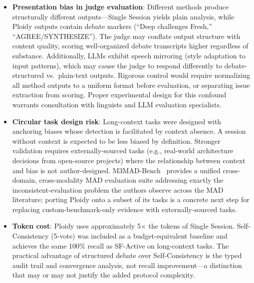 \documentclass[11pt]{article}
\begin{document}
\begin{itemize}[leftmargin=1.5em]
  \item \textbf{Presentation bias in judge evaluation}: Different methods produce structurally different outputs---Single Session yields plain analysis, while Ploidy outputs contain debate markers (``Deep challenges Fresh,'' ``AGREE/SYNTHESIZE''). The judge may conflate output structure with content quality, scoring well-organized debate transcripts higher regardless of substance. Additionally, LLMs exhibit speech mirroring (style adaptation to input patterns), which may cause the judge to respond differently to debate-structured vs.\ plain-text outputs. Rigorous control would require normalizing all method outputs to a uniform format before evaluation, or separating issue extraction from scoring. Proper experimental design for this confound warrants consultation with linguists and LLM evaluation specialists.
  \item \textbf{Circular task design risk}: Long-context tasks were designed with anchoring biases whose detection is facilitated by context absence. A session without context is expected to be less biased by definition. Stronger validation requires externally-sourced tasks (e.g., real-world architecture decisions from open-source projects) where the relationship between context and bias is not author-designed. M3MAD-Bench~\citep{li2026m3madbench} provides a unified cross-domain, cross-modality MAD evaluation suite addressing exactly the inconsistent-evaluation problem the authors observe across the MAD literature; porting Ploidy onto a subset of its tasks is a concrete next step for replacing custom-benchmark-only evidence with externally-sourced tasks.
  \item \textbf{Token cost}: Ploidy uses approximately 5$\times$ the tokens of Single Session. Self-Consistency (5-vote) was included as a budget-equivalent baseline and achieves the same 100\% recall as SF-Active on long-context tasks. The practical advantage of structured debate over Self-Consistency is the typed audit trail and convergence analysis, not recall improvement---a distinction that may or may not justify the added protocol complexity.

\end{itemize}
\end{document}
